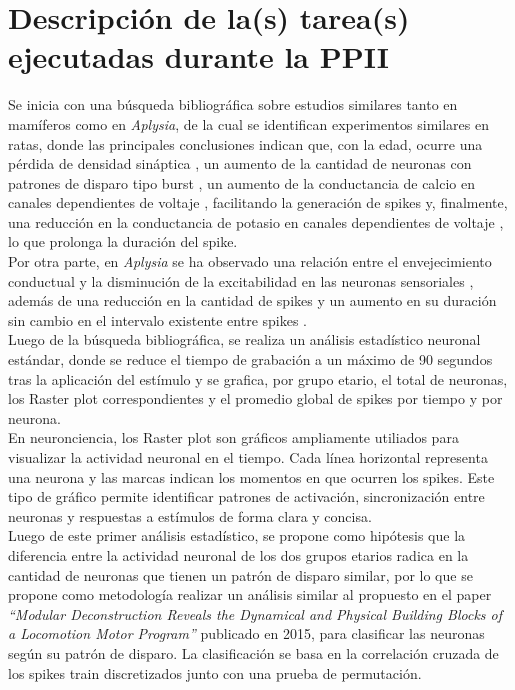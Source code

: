 \section{Descripción de la(s) tarea(s) ejecutadas durante la PPII}


Se inicia con una búsqueda bibliográfica sobre estudios similares tanto en mamíferos como en \textit{Aplysia}, de la cual se identifican experimentos similares en ratas, donde las principales conclusiones indican que, con la edad, ocurre una pérdida de densidad sináptica \cite{bib perdida sinaptica}, un aumento de la cantidad de neuronas con patrones de disparo tipo burst \cite{bib burst}, un aumento de la conductancia de calcio en canales dependientes de voltaje \cite{bib Ca}, facilitando la generación de spikes y, finalmente, una reducción en la conductancia de potasio en canales dependientes de voltaje \cite{bib Potasio}, lo que prolonga la duración del spike.\\

Por otra parte, en \textit{Aplysia} se ha observado una relación entre el envejecimiento conductual y la disminución de la excitabilidad en las neuronas sensoriales \cite{bib sensoriales}, además de una reducción en la cantidad de spikes y un aumento en su duración sin cambio en el intervalo existente entre spikes \cite{bib cantidad}.\\

Luego de la búsqueda bibliográfica, se realiza un análisis estadístico neuronal estándar, donde se reduce el tiempo de grabación a un máximo de 90 segundos tras la aplicación del estímulo y se grafica, por grupo etario, el total de neuronas, los Raster plot correspondientes y el promedio global de spikes por tiempo y por neurona.\\

En neuronciencia, los Raster plot son gráficos ampliamente utiliados para visualizar la actividad neuronal en el tiempo. Cada línea horizontal representa una neurona y las marcas indican los momentos en que ocurren los spikes. Este tipo de gráfico permite identificar patrones de activación, sincronización entre neuronas y respuestas a estímulos de forma clara y concisa.\\


Luego de este primer análisis estadístico, se propone como hipótesis que la diferencia entre la actividad neuronal de los dos grupos etarios radica en la cantidad de neuronas que tienen un patrón de disparo similar, por lo que se propone como metodología realizar un análisis similar al propuesto en el paper \textit{``Modular Deconstruction Reveals the Dynamical and Physical Building Blocks of a Locomotion Motor Program''} \cite{AMB} publicado en 2015, para clasificar las neuronas según su patrón de disparo. La clasificación se basa en la correlación cruzada de los spikes train discretizados junto con una prueba de permutación. \\

